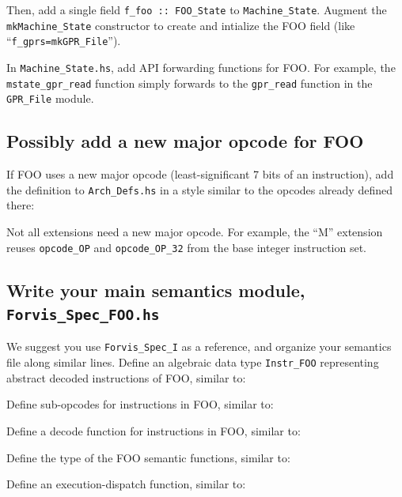 \documentclass[11pt]{article}
\begin{document}
Then, add a single field \verb|f_foo :: FOO_State| to
\verb|Machine_State|.  Augment the \verb|mkMachine_State| constructor
to create and intialize the FOO field (like
``\verb|f_gprs=mkGPR_File|'').

In \verb|Machine_State.hs|, add API forwarding functions for FOO.  For
example, the \verb|mstate_gpr_read| function simply forwards to the
\verb|gpr_read| function in the \verb|GPR_File| module.


\subsection{Possibly add a new major opcode for FOO}

If FOO uses a new major opcode (least-significant 7 bits of an
instruction), add the definition to \verb|Arch_Defs.hs| in a style
similar to the opcodes already defined there:



Not all extensions need a new major opcode.  For example, the ``M''
extension reuses \verb|opcode_OP| and \verb|opcode_OP_32| from the
base integer instruction set.


\subsection{Write your main semantics module, {\tt Forvis\_Spec\_FOO.hs}}

We suggest you use \verb|Forvis_Spec_I| as a reference, and organize
your semantics file along similar lines.  Define an algebraic data
type \verb|Instr_FOO| representing abstract decoded instructions of
FOO, similar to:



Define sub-opcodes for instructions in FOO, similar to:



Define a decode function for instructions in FOO, similar to:



Define the type of the FOO semantic functions, similar to:



Define an execution-dispatch function, similar to:
\end{document}
